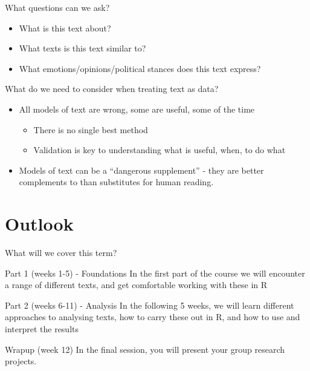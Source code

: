 \documentclass[
  10pt,
  ignorenonframetext,
  aspectratio=169]{beamer}
\begin{document}
\begin{frame}{What questions can we ask?}
\protect\hypertarget{what-questions-can-we-ask}{}
\begin{itemize}
  \item{What is this text about?}
  \item{What texts is this text similar to?}
  \item{What emotions/opinions/political stances does this text express?}
\end{itemize}
\end{frame}

\begin{frame}{What do we need to consider when treating text as data?}
\protect\hypertarget{what-do-we-need-to-consider-when-treating-text-as-data}{}
\label{CONSIDERATIONS}

\begin{itemize}
  \item<1-> All models of text are wrong, some are useful, some of the time 
  \begin{itemize}
    \item<2-> There is no single best method
    \item<3-> Validation is key to understanding what is useful, when, to do what
  \end{itemize}
  \item<4-> Models of text can be a ``dangerous supplement''  \hyperlink{PHARMAKON}{} - they are better complements to than substitutes for human reading.


\end{itemize}
\end{frame}

\hypertarget{outlook}{%
\section{Outlook}\label{outlook}}

\begin{frame}{What will we cover this term?}
\protect\hypertarget{what-will-we-cover-this-term}{}
\begin{block}{Part 1 (weeks 1-5) - Foundations}
\protect\hypertarget{part-1-weeks-1-5---foundations}{}
In the first part of the course we will encounter a range of different
texts, and get comfortable working with these in R
\end{block}

\begin{block}{Part 2 (weeks 6-11) - Analysis}
\protect\hypertarget{part-2-weeks-6-11---analysis}{}
In the following 5 weeks, we will learn different approaches to
analysing texts, how to carry these out in R, and how to use and
interpret the results
\end{block}

\begin{block}{Wrapup (week 12)}
\protect\hypertarget{wrapup-week-12}{}
In the final session, you will present your group research projects.
\end{block}
\end{frame}
\end{document}
